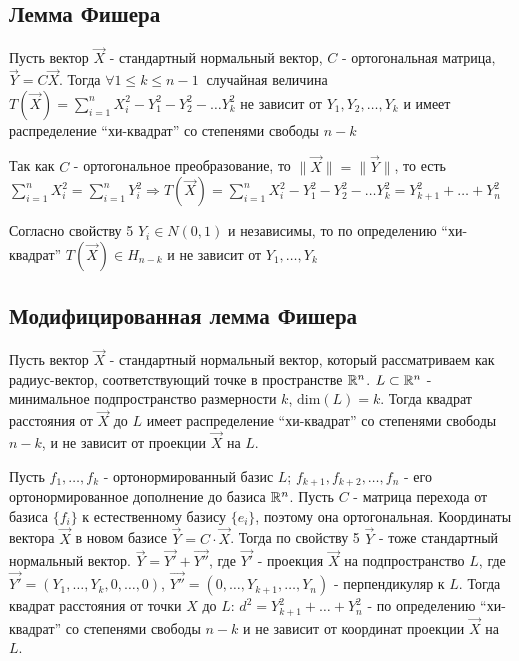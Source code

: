 \documentclass[12pt]{article}
\begin{document}
\subsection{Лемма Фишера}

\hypertarget{fishers_lemma}{}

\begin{MyTheorem}
    Пусть вектор $\vec X$ - стандартный нормальный вектор, $C$ - ортогональная матрица, $\vec Y = C \vec X$.
    Тогда $\forall 1 \leq k \leq n - 1 \ $ случайная величина $T(\vec X) = \sum_{i = 1}^n X_i^2 - Y_1^2 - Y_2^2 - \dots Y_k^2$ 
    не зависит от $Y_1, Y_2, \dots, Y_k$ и имеет распределение \enquote{хи-квадрат} со степенями свободы $n - k$
\end{MyTheorem}

\begin{MyProof}
    Так как $C$ - ортогональное преобразование, то $\|\vec X\| = \|\vec Y\|$, то есть $\sum_{i = 1}^n X^2_i = \sum_{i = 1}^n Y^2_i \Longrightarrow
    T(\vec X) = \sum_{i = 1}^n X_i^2 - Y_1^2 - Y_2^2 - \dots Y_k^2 = Y^2_{k + 1} + \dots + Y^2_{n}$

    Согласно свойству 5 $Y_i \in N(0, 1)$ и независимы, то по определению \enquote{хи-квадрат} $T(\vec X) \in H_{n - k}$ и не зависит от $Y_1, \dots, Y_k$
\end{MyProof}

\subsection{Модифицированная лемма Фишера}

\vspace{-2.5em}
\hfill \TagYTwoEight

\hypertarget{modified_fishers_lemma}{}

\begin{MyTheorem}
    Пусть вектор $\vec X$ - стандартный нормальный вектор, который рассматриваем как радиус-вектор, 
    соответствующий точке в пространстве $\mathbb{R}^n$. $L \subset \mathbb{R}^n$ - минимальное подпространство размерности $k$, 
    $\mathrm{dim}(L) = k$. Тогда квадрат расстояния от $\vec X$ до $L$ имеет распределение \enquote{хи-квадрат} со степенями свободы $n - k$,
    и не зависит от проекции $\vec X$ на $L$.
\end{MyTheorem}

\begin{MyProof}
    Пусть $f_1, \dots , f_k$ - ортонормированный базис $L$;
    $f_{k+1}, f_{k+2}, \dots , f_n$ - его ортонормированное дополнение до базиса $\mathbb{R}^n$.
    Пусть $C$ - матрица перехода от базиса $\{f_i\}$ к естественному базису $\{e_i\}$, поэтому она ортогональная.
    Координаты вектора $\vec X$ в новом базисе $\vec Y = C \cdot \vec X$. Тогда по свойству 5 $\vec Y$ - тоже стандартный  нормальный вектор.
    $\vec Y = \vec {Y'} + \vec {Y''}$, где $\vec {Y'}$ - проекция $\vec X$ на подпространство $L$,
    где $\vec {Y'} = (Y_1, \dots , Y_k, 0, \dots , 0)$, $\vec {Y''} = (0, \dots , Y_{k+1}, \dots , Y_n)$ - перпендикуляр к $L$.
    Тогда квадрат расстояния от точки $X$ до $L$: $d^2 = Y_{k+1}^2 + \dots + Y_n^2$ - по определению \enquote{хи-квадрат} со степенями свободы $n - k$
    и не зависит от координат проекции $\vec X$ на $L$. 
\end{MyProof}
\end{document}
